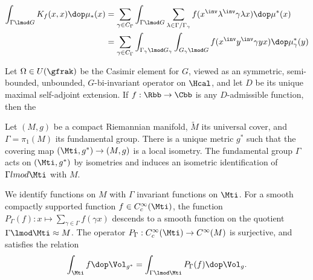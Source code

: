 \begin{align}
    \int_{\Gamma \lmod G} K_f(x,x) \dop \mu_* (x) & = \sum_{\gamma \in C_\Gamma}\int_{\Gamma \lmod G} \sum_{\lambda \in \Gamma / \Gamma_\gamma}  f(x^\inv \lambda^\inv  \gamma \lambda x) \dop \mu^*(x) \\
                                                  & =\sum_{\gamma \in C_\Gamma} \int_{\Gamma_\gamma \lmod G_\gamma}\int_{G_\gamma \lmod G} f(x^\inv y^\inv  \gamma y x) \dop\mu^*_\gamma(y)
\end{align}






Let $\Omega \in U(\gfrak)$ be the Casimir element for $G$, viewed as an symmetric, semi-bounded, unbounded, $G$-bi-invariant operator on $\Hcal$, and let $D$ be its unique maximal self-adjoint extension. If $f : \Rbb \to \Cbb$ is any $D$-admissible function, then the






Let $(M,g)$ be a compact Riemannian manifold, $\tilde{M}$ its universal cover, and $\Gamma =\pi_1(M)$ its fundamental group. There is a unique metric $g^*$ such that the covering map $(\Mti, g^*) \to (M,g)$ is a local isometry.  The fundamental group $\Gamma$ acts on $(\Mti,g^*)$ by isometries and induces an isometric identification of $\Gamma lmod \Mti$ with $M$.

We identify functions on $M$ with $\Gamma$ invariant functions on $\Mti$.  For a smooth compactly supported function $f \in C_c^\infty(\Mti)$, the function $P_\Gamma(f) : x \mapsto \sum_{\gamma \in \Gamma}f(\gamma x)$ descends to a smooth function on the quotient $\Gamma \lmod \Mti \approx M$. The operator $P_\Gamma:C_c^\infty(\Mti)\to C^\infty(M)$ is surjective, and satisfies the relation
\begin{align}\label{eq:average}
    \int_{\Mti} f \dop \Vol_{g^*}  = \int_{\Gamma \lmod \Mti} P_\Gamma (f) \dop \Vol_{g}.
\end{align}
























